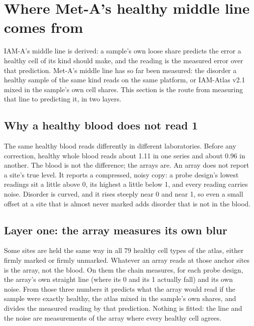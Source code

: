 
\section{Where Met-A's healthy middle line comes from}\label{sec:metaa_healthy_line}

IAM-A's middle line is derived: a sample's own loose share predicts the error a healthy cell of its kind should make, and the reading is
the measured error over that prediction. Met-A's middle line has so far been measured: the disorder a healthy sample of the same kind
reads on the same platform, or IAM-Atlas v2.1 mixed in the sample's own cell shares. This section is the route from measuring that line
to predicting it, in two layers.

\subsection{Why a healthy blood does not read 1}

The same healthy blood reads differently in different laboratories. Before any correction, healthy whole blood reads about 1.11 in one
series and about 0.96 in another. The blood is not the difference; the arrays are. An array does not report a site's true level. It
reports a compressed, noisy copy: a probe design's lowest readings sit a little above 0, its highest a little below 1, and every reading
carries noise. Disorder is curved, and it rises steeply near 0 and near 1, so even a small offset at a site that is almost never marked
adds disorder that is not in the blood.

\subsection{Layer one: the array measures its own blur}

Some sites are held the same way in all 79 healthy cell types of the atlas, either firmly marked or firmly unmarked. Whatever an array
reads at those anchor sites is the array, not the blood. On them the chain measures, for each probe design, the array's own straight line
(where its 0 and its 1 actually fall) and its own noise. From those three numbers it predicts what the array would read if the sample
were exactly healthy, the atlas mixed in the sample's own shares, and divides the measured reading by that prediction. Nothing is fitted:
the line and the noise are measurements of the array where every healthy cell agrees.

